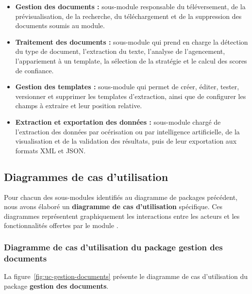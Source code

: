 \begin{itemize}
    \item[\opmanicule] \textbf{Gestion des documents :} sous-module responsable du
    téléversement, de la prévisualisation, de la recherche, du téléchargement et de la
    suppression des documents soumis au module.

    \item[\opmanicule] \textbf{Traitement des documents :} sous-module qui prend en charge la
    détection du type de document, l'extraction du texte, l'analyse de l'agencement,
    l'appariement à un template, la sélection de la stratégie et le calcul des scores de
    confiance.

    \item[\opmanicule] \textbf{Gestion des templates :} sous-module qui permet de créer,
    éditer, tester, versionner et supprimer les templates d'extraction, ainsi que de configurer
    les champs à extraire et leur position relative.

    \item[\opmanicule] \textbf{Extraction et exportation des données :} sous-module chargé de
    l'extraction des données par océrisation ou par intelligence artificielle, de la
    visualisation et de la validation des résultats, puis de leur exportation aux formats XML
    et JSON.
\end{itemize}

\subsection{Diagrammes de cas d'utilisation}
\label{subsec:diagrammes-cas-utilisation}

Pour chacun des sous-modules identifiés au diagramme de packages précédent, nous avons élaboré
un \textbf{diagramme de cas d'utilisation} spécifique. Ces diagrammes représentent
graphiquement les interactions entre les acteurs et les fonctionnalités offertes par le module
\cite{omg2017uml}.

\subsubsection{Diagramme de cas d'utilisation du package gestion des documents}

La figure~\ref{fig:uc-gestion-documents} présente le diagramme de cas d'utilisation du package
\textbf{gestion des documents}.

